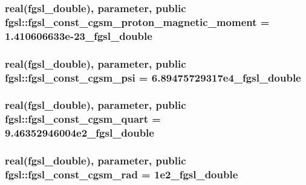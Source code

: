 \hypertarget{classfgsl_a91a53064c6d7b4c8af4bf3368a896d74}{
\subsubsection[{fgsl\-\_\-const\-\_\-cgsm\-\_\-proton\-\_\-magnetic\-\_\-moment}]{\setlength{\rightskip}{0pt plus 5cm}real({\bf fgsl\-\_\-double}), parameter, public fgsl\-::fgsl\-\_\-const\-\_\-cgsm\-\_\-proton\-\_\-magnetic\-\_\-moment = 1.\-410606633e-\/23\-\_\-fgsl\-\_\-double}}\label{classfgsl_a91a53064c6d7b4c8af4bf3368a896d74}
\hypertarget{classfgsl_adbc0f817c0f6ab5ff3cb517430c2a28f}{
\subsubsection[{fgsl\-\_\-const\-\_\-cgsm\-\_\-psi}]{\setlength{\rightskip}{0pt plus 5cm}real({\bf fgsl\-\_\-double}), parameter, public fgsl\-::fgsl\-\_\-const\-\_\-cgsm\-\_\-psi = 6.\-89475729317e4\-\_\-fgsl\-\_\-double}}\label{classfgsl_adbc0f817c0f6ab5ff3cb517430c2a28f}
\hypertarget{classfgsl_a1dd9210eaaf96e8f99597ede1f808892}{
\subsubsection[{fgsl\-\_\-const\-\_\-cgsm\-\_\-quart}]{\setlength{\rightskip}{0pt plus 5cm}real({\bf fgsl\-\_\-double}), parameter, public fgsl\-::fgsl\-\_\-const\-\_\-cgsm\-\_\-quart = 9.\-46352946004e2\-\_\-fgsl\-\_\-double}}\label{classfgsl_a1dd9210eaaf96e8f99597ede1f808892}
\hypertarget{classfgsl_aa616f1f47c1a107f10dcb7418517b723}{
\subsubsection[{fgsl\-\_\-const\-\_\-cgsm\-\_\-rad}]{\setlength{\rightskip}{0pt plus 5cm}real({\bf fgsl\-\_\-double}), parameter, public fgsl\-::fgsl\-\_\-const\-\_\-cgsm\-\_\-rad = 1e2\-\_\-fgsl\-\_\-double}}\label{classfgsl_aa616f1f47c1a107f10dcb7418517b723}
